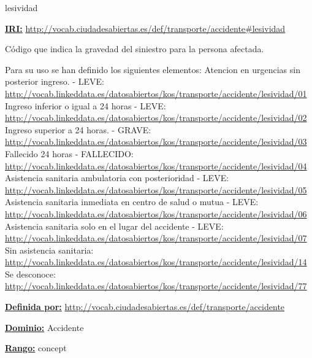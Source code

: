 \begin{mybox}{lesividad}
\begin{flushleft}
\underline{\textbf{IRI:}}
\url{http://vocab.ciudadesabiertas.es/def/transporte/accidente#lesividad}
\newline

Código que indica la gravedad del siniestro para la persona afectada.
\newline

Para su uso se han definido los siguientes elementos:
 Atencion en urgencias sin posterior ingreso. - LEVE:
\newline \url{http://vocab.linkeddata.es/datosabiertos/kos/transporte/accidente/lesividad/01}
 Ingreso inferior o igual a 24 horas - LEVE:
\newline \url{http://vocab.linkeddata.es/datosabiertos/kos/transporte/accidente/lesividad/02}
 Ingreso superior a 24 horas. - GRAVE:
\newline \url{http://vocab.linkeddata.es/datosabiertos/kos/transporte/accidente/lesividad/03}
 Fallecido 24 horas - FALLECIDO:
\newline \url{http://vocab.linkeddata.es/datosabiertos/kos/transporte/accidente/lesividad/04}
 Asistencia sanitaria ambulatoria con posterioridad - LEVE:
\newline \url{http://vocab.linkeddata.es/datosabiertos/kos/transporte/accidente/lesividad/05}
 Asistencia sanitaria inmediata en centro de salud o mutua - LEVE:
\newline \url{http://vocab.linkeddata.es/datosabiertos/kos/transporte/accidente/lesividad/06}
 Asistencia sanitaria solo en el lugar del accidente - LEVE:
\newline \url{http://vocab.linkeddata.es/datosabiertos/kos/transporte/accidente/lesividad/07}
 Sin asistencia sanitaria:
\newline \url{http://vocab.linkeddata.es/datosabiertos/kos/transporte/accidente/lesividad/14}
 Se desconoce:
\newline \url{http://vocab.linkeddata.es/datosabiertos/kos/transporte/accidente/lesividad/77}
\newline


\underline{\textbf{Definida por:}}
\newline \url{http://vocab.ciudadesabiertas.es/def/transporte/accidente}
\newline

\underline{\textbf{Dominio:}}  Accidente
\newline

\underline{\textbf{Rango:}} concept
\newline

\end{flushleft}
\end{mybox}
